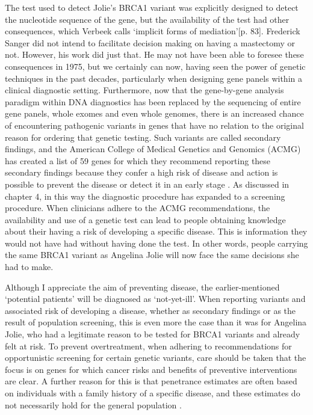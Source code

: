 The test used to detect Jolie’s BRCA1 variant was explicitly designed to detect the nucleotide sequence of the gene, but the availability of the test had other consequences, which Verbeek calls ‘implicit forms of mediation’[p. 83]. 
Frederick Sanger did not intend to facilitate decision making on having a mastectomy or not. 
However, his work did just that. He may not have been able to foresee these consequences in 1975, but we certainly can now, having seen the power of genetic techniques in the past decades, particularly when designing gene panels within a clinical diagnostic setting. 
Furthermore, now that the gene-by-gene analysis paradigm within DNA diagnostics has been replaced by the sequencing of entire gene panels, whole exomes and even whole genomes, there is an increased chance of encountering pathogenic variants in genes that have no relation to the original reason for ordering that genetic testing. 
Such variants are called secondary findings, and the American College of Medical Genetics and Genomics (ACMG) has created a list of 59 genes for which they recommend reporting these secondary findings because they confer a high risk of disease and action is possible to prevent the disease or detect it in an early stage \cite{Kalia_2016}. 
As discussed in chapter 4, in this way the diagnostic procedure has expanded to a screening procedure. 
When clinicians adhere to the ACMG recommendations, the availability and use of a genetic test can lead to people obtaining knowledge about their having a risk of developing a specific disease. 
This is information they would not have had without having done the test. 
In other words, people carrying the same BRCA1 variant as Angelina Jolie will now face the same decisions she had to make.

Although I appreciate the aim of preventing disease, the earlier-mentioned ‘potential patients’ will be diagnosed as ‘not-yet-ill’. 
When reporting variants and associated risk of developing a disease, whether as secondary findings or as the result of population screening, this is even more the case than it was for Angelina Jolie, who had a legitimate reason to be tested for BRCA1 variants and already felt at risk. 
To prevent overtreatment, when adhering to recommendations for opportunistic screening for certain genetic variants, care should be taken that the focus is on genes for which cancer risks and benefits of preventive interventions are clear. 
A further reason for this is that penetrance estimates are often based on individuals with a family history of a specific disease, and these estimates do not necessarily hold for the general population \cite{Wentzensen_2018}.

